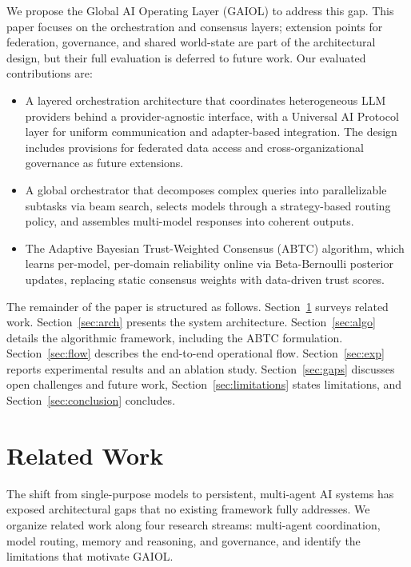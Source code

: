 \documentclass{iopjournal}
\begin{document}
We propose the Global AI Operating Layer (GAIOL) to address this gap. This paper focuses on the orchestration and consensus layers; extension points for federation, governance, and shared world-state are part of the architectural design, but their full evaluation is deferred to future work. Our evaluated contributions are:
\begin{itemize}
    \item A layered orchestration architecture that coordinates heterogeneous LLM providers behind a provider-agnostic interface, with a Universal AI Protocol layer for uniform communication and adapter-based integration. The design includes provisions for federated data access and cross-organizational governance as future extensions.
    \item A global orchestrator that decomposes complex queries into parallelizable subtasks via beam search, selects models through a strategy-based routing policy, and assembles multi-model responses into coherent outputs.
    \item The Adaptive Bayesian Trust-Weighted Consensus (ABTC) algorithm, which learns per-model, per-domain reliability online via Beta-Bernoulli posterior updates, replacing static consensus weights with data-driven trust scores.
\end{itemize}

The remainder of the paper is structured as follows. Section~\ref{sec:lit} surveys related work. Section~\ref{sec:arch} presents the system architecture. Section~\ref{sec:algo} details the algorithmic framework, including the ABTC formulation. Section~\ref{sec:flow} describes the end-to-end operational flow. Section~\ref{sec:exp} reports experimental results and an ablation study. Section~\ref{sec:gaps} discusses open challenges and future work, Section~\ref{sec:limitations} states limitations, and Section~\ref{sec:conclusion} concludes.

\section{Related Work}
\label{sec:lit}
The shift from single-purpose models to persistent, multi-agent AI systems has exposed architectural gaps that no existing framework fully addresses. We organize related work along four research streams: multi-agent coordination, model routing, memory and reasoning, and governance, and identify the limitations that motivate GAIOL.
\end{document}

